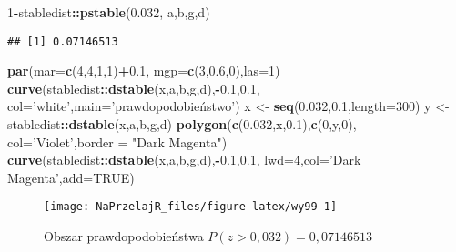 \documentclass[polish,]{book}
\newenvironment{Shaded}{\begin{snugshade}}{\end{snugshade}}
\newcommand{\DataTypeTok}[1]{\textcolor[rgb]{0.13,0.29,0.53}{#1}}
\newcommand{\DecValTok}[1]{\textcolor[rgb]{0.00,0.00,0.81}{#1}}
\newcommand{\FloatTok}[1]{\textcolor[rgb]{0.00,0.00,0.81}{#1}}
\newcommand{\KeywordTok}[1]{\textcolor[rgb]{0.13,0.29,0.53}{\textbf{#1}}}
\newcommand{\NormalTok}[1]{#1}
\newcommand{\OperatorTok}[1]{\textcolor[rgb]{0.81,0.36,0.00}{\textbf{#1}}}
\newcommand{\OtherTok}[1]{\textcolor[rgb]{0.56,0.35,0.01}{#1}}
\newcommand{\StringTok}[1]{\textcolor[rgb]{0.31,0.60,0.02}{#1}}
\begin{document}
\begin{Shaded}
\begin{Highlighting}[]
\DecValTok{1}\OperatorTok{-}\NormalTok{stabledist}\OperatorTok{::}\KeywordTok{pstable}\NormalTok{(}\FloatTok{0.032}\NormalTok{, a,b,g,d)}
\end{Highlighting}
\end{Shaded}

\begin{verbatim}
## [1] 0.07146513
\end{verbatim}

\begin{Shaded}
\begin{Highlighting}[]
\KeywordTok{par}\NormalTok{(}\DataTypeTok{mar=}\KeywordTok{c}\NormalTok{(}\DecValTok{4}\NormalTok{,}\DecValTok{4}\NormalTok{,}\DecValTok{1}\NormalTok{,}\DecValTok{1}\NormalTok{)}\OperatorTok{+}\FloatTok{0.1}\NormalTok{, }\DataTypeTok{mgp=}\KeywordTok{c}\NormalTok{(}\DecValTok{3}\NormalTok{,}\FloatTok{0.6}\NormalTok{,}\DecValTok{0}\NormalTok{),}\DataTypeTok{las=}\DecValTok{1}\NormalTok{)}
\KeywordTok{curve}\NormalTok{(stabledist}\OperatorTok{::}\KeywordTok{dstable}\NormalTok{(x,a,b,g,d),}\OperatorTok{-}\FloatTok{0.1}\NormalTok{,}\FloatTok{0.1}\NormalTok{,}
      \DataTypeTok{col=}\StringTok{'white'}\NormalTok{,}\DataTypeTok{main=}\StringTok{'prawdopodobieństwo'}\NormalTok{)}
\NormalTok{x <-}\StringTok{ }\KeywordTok{seq}\NormalTok{(}\FloatTok{0.032}\NormalTok{,}\FloatTok{0.1}\NormalTok{,}\DataTypeTok{length=}\DecValTok{300}\NormalTok{)}
\NormalTok{y <-}\StringTok{ }\NormalTok{stabledist}\OperatorTok{::}\KeywordTok{dstable}\NormalTok{(x,a,b,g,d)}
\KeywordTok{polygon}\NormalTok{(}\KeywordTok{c}\NormalTok{(}\FloatTok{0.032}\NormalTok{,x,}\FloatTok{0.1}\NormalTok{),}\KeywordTok{c}\NormalTok{(}\DecValTok{0}\NormalTok{,y,}\DecValTok{0}\NormalTok{),}
        \DataTypeTok{col=}\StringTok{'Violet'}\NormalTok{,}\DataTypeTok{border =} \StringTok{"Dark Magenta"}\NormalTok{)}
\KeywordTok{curve}\NormalTok{(stabledist}\OperatorTok{::}\KeywordTok{dstable}\NormalTok{(x,a,b,g,d),}\OperatorTok{-}\FloatTok{0.1}\NormalTok{,}\FloatTok{0.1}\NormalTok{,}
      \DataTypeTok{lwd=}\DecValTok{4}\NormalTok{,}\DataTypeTok{col=}\StringTok{'Dark Magenta'}\NormalTok{,}\DataTypeTok{add=}\OtherTok{TRUE}\NormalTok{)}
\end{Highlighting}
\end{Shaded}

\begin{figure}[h]

{\centering \texttt{[image: NaPrzelajR\_files/figure-latex/wy99-1]} 

}

\caption{Obszar prawdopodobieństwa $P(z>0,032)=0,07146513$}\label{fig:wy99}
\end{figure}
\end{document}

